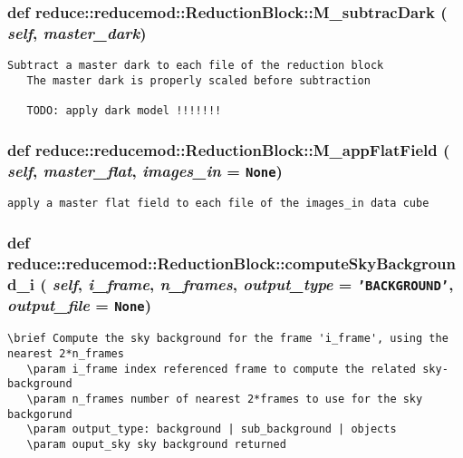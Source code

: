 \subsubsection{\setlength{\rightskip}{0pt plus 5cm}def reduce::reducemod::Reduction\-Block::M\_\-subtrac\-Dark ( {\em self},  {\em master\_\-dark})}\label{classreduce_1_1reducemod_1_1ReductionBlock_91fb83e2fff50de11038efeab1e0a366}




\footnotesize\begin{verbatim}Subtract a master dark to each file of the reduction block
   The master dark is properly scaled before subtraction
   
   TODO: apply dark model !!!!!!!
\end{verbatim}
\normalsize
\subsubsection{\setlength{\rightskip}{0pt plus 5cm}def reduce::reducemod::Reduction\-Block::M\_\-app\-Flat\-Field ( {\em self},  {\em master\_\-flat},  {\em images\_\-in} = {\tt None})}\label{classreduce_1_1reducemod_1_1ReductionBlock_7733e44b77109db7f06baae1838c04c7}




\footnotesize\begin{verbatim}apply a master flat field to each file of the images_in data cube
\end{verbatim}
\normalsize
\subsubsection{\setlength{\rightskip}{0pt plus 5cm}def reduce::reducemod::Reduction\-Block::compute\-Sky\-Background\_\-i ( {\em self},  {\em i\_\-frame},  {\em n\_\-frames},  {\em output\_\-type} = {\tt 'BACKGROUND'},  {\em output\_\-file} = {\tt None})}\label{classreduce_1_1reducemod_1_1ReductionBlock_a02cee4de81a204bbb46612453874abe}




\footnotesize\begin{verbatim}\brief Compute the sky background for the frame 'i_frame', using the nearest 2*n_frames
   \param i_frame index referenced frame to compute the related sky-background
   \param n_frames number of nearest 2*frames to use for the sky backgorund
   \param output_type: background | sub_background | objects
   \param ouput_sky sky background returned
\end{verbatim}
\normalsize
